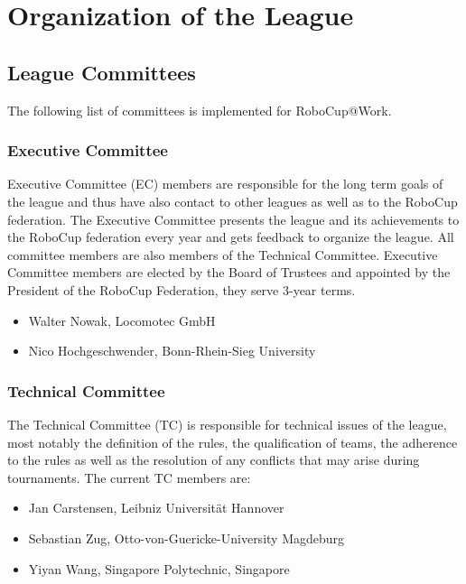 \section{Organization of the League}\label{sec:organisation_of_the_league}

\subsection{League Committees}
The following list of committees is implemented for RoboCup@Work.

\subsubsection{Executive Committee}

Executive Committee (EC) members are responsible for the long term goals of the league and thus have also contact to other leagues as well as to the RoboCup federation. The Executive Committee presents the league and its achievements to the RoboCup federation every year and gets feedback to organize the league. All committee members are also members of the Technical Committee. Executive Committee members are elected by the Board of Trustees and appointed by the President of the RoboCup Federation, they serve 3-year terms.

\begin{itemize}
	\item Walter Nowak, Locomotec GmbH
	\item Nico Hochgeschwender, Bonn-Rhein-Sieg University
\end{itemize}


\subsubsection{Technical Committee}
The Technical Committee (TC) is responsible for technical issues of the league, most notably the definition of the rules, the qualification of teams, the adherence to the rules as well as the resolution of any conflicts that may arise during tournaments. The current TC members are:

\begin{itemize}
	\item Jan Carstensen, Leibniz Universit\"at Hannover
	\item Sebastian Zug, Otto-von-Guericke-University Magdeburg
	\item Yiyan Wang, Singapore Polytechnic, Singapore
\end{itemize}


